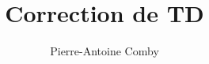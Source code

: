 \documentclass{../../td}
\title{Correction de TD}
\author{Pierre-Antoine Comby}
\begin{document}
\maketitle
\tableofcontents
\section{}
%
\section{}

\section{}
\end{document}
